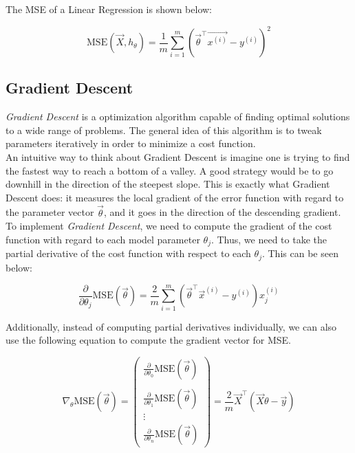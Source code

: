 \noindent 
The MSE of a Linear Regression is shown below:

$$\text{MSE}(\vec{X}, h_{\theta}) = \frac{1}{m} \sum^{m}_{i = 1} (\vec{\theta}^{\intercal}\vec{x^{(i)}} - y^{(i)})^{2}$$

\subsection{Gradient Descent}

\textit{Gradient Descent} is a optimization algorithm capable of finding optimal 
solutions to a wide range of problems. The general idea of this algorithm is to tweak parameters
iteratively in order to minimize a cost function.\\

\noindent 
An intuitive way to think about Gradient Descent is imagine one is trying to find
the fastest way to reach a bottom of a valley. A good strategy would be to go downhill in 
the direction of the steepest slope. This is exactly what Gradient Descent does: it measures
the local gradient of the error function with regard to the parameter vector $\vec{\theta}$,
and it goes in the direction of the descending gradient. \\

\noindent
To implement \textit{Gradient Descent}, we need to compute the gradient of the cost function with
regard to each model parameter $\theta_{j}$. Thus, we need to take the partial derivative of the 
cost function with respect to each $\theta_{j}$. This can be seen below:

$$\frac{\partial}{\partial \theta_{j}} \text{MSE}(\vec{\theta}) = \frac{2}{m} \sum^{m}_{i = 1} (\vec{\theta}^{\intercal} \vec{x}^{(i)} - y^{(i)}) x_{j}^{(i)}$$

\noindent
Additionally, instead of computing partial derivatives individually, we can also use the following
equation to compute the gradient vector for MSE.

$$
\nabla_{\theta} \text{MSE}(\vec{\theta}) =  
\begin{pmatrix}
\frac{\partial}{\partial \theta_{0}} \text{MSE}(\vec{\theta}) \\ \\
\frac{\partial}{\partial \theta_{1}} \text{MSE}(\vec{\theta}) \\ 
\vdots \\ 
\frac{\partial}{\partial \theta_{n}} \text{MSE}(\vec{\theta})
\end{pmatrix}
= \frac{2}{m}\vec{X}^{\intercal}(\vec{X}\theta - \vec{y})
$$ \\

